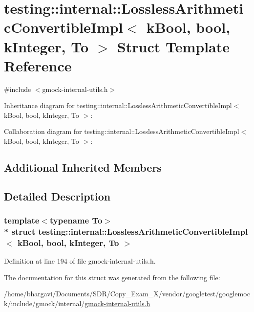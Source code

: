 \hypertarget{structtesting_1_1internal_1_1_lossless_arithmetic_convertible_impl_3_01k_bool_00_01bool_00_01k_integer_00_01_to_01_4}{}\section{testing\+:\+:internal\+:\+:Lossless\+Arithmetic\+Convertible\+Impl$<$ k\+Bool, bool, k\+Integer, To $>$ Struct Template Reference}
\label{structtesting_1_1internal_1_1_lossless_arithmetic_convertible_impl_3_01k_bool_00_01bool_00_01k_integer_00_01_to_01_4}


{\ttfamily \#include $<$gmock-\/internal-\/utils.\+h$>$}



Inheritance diagram for testing\+:\+:internal\+:\+:Lossless\+Arithmetic\+Convertible\+Impl$<$ k\+Bool, bool, k\+Integer, To $>$\+:


Collaboration diagram for testing\+:\+:internal\+:\+:Lossless\+Arithmetic\+Convertible\+Impl$<$ k\+Bool, bool, k\+Integer, To $>$\+:
\subsection*{Additional Inherited Members}


\subsection{Detailed Description}
\subsubsection*{template$<$typename To$>$\\*
struct testing\+::internal\+::\+Lossless\+Arithmetic\+Convertible\+Impl$<$ k\+Bool, bool, k\+Integer, To $>$}



Definition at line 194 of file gmock-\/internal-\/utils.\+h.



The documentation for this struct was generated from the following file\+:\begin{DoxyCompactItemize}
\item 
/home/bhargavi/\+Documents/\+S\+D\+R/\+Copy\+\_\+\+Exam\+\_\+X/vendor/googletest/googlemock/include/gmock/internal/\hyperlink{gmock-internal-utils_8h}{gmock-\/internal-\/utils.\+h}\end{DoxyCompactItemize}
